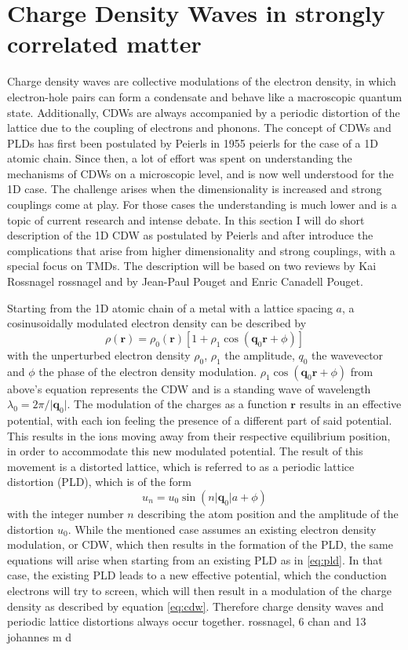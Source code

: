 \section{Charge Density Waves in strongly correlated matter}

Charge density waves are collective modulations of the electron density, in which electron-hole pairs can form a condensate and behave like a macroscopic quantum state.
Additionally, CDWs are always accompanied by a periodic distortion of the lattice due to the coupling of electrons and phonons.
The concept of CDWs and PLDs has first been postulated by Peierls in 1955 \cite{} peierls for the case of a 1D atomic chain.
Since then, a lot of effort was spent on understanding the mechanisms of CDWs on a microscopic level, and is now well understood for the 1D case.
The challenge arises when the dimensionality is increased and strong couplings come at play.
For those cases the understanding is much lower and is a topic of current research and intense debate.
In this section I will do short description of the 1D CDW as postulated by Peierls and after introduce the complications that arise from higher dimensionality and strong couplings, with a special focus on TMDs.
The description will be based on two reviews by Kai Rossnagel \cite{} rossnagel and by Jean-Paul Pouget and Enric Canadell \cite{} Pouget.

Starting from the 1D atomic chain of a metal with a lattice spacing $a$, a cosinusoidally modulated electron density can be described by
\begin{equation}
	\rho(\mathbf{r}) = \rho_0(\mathbf{r})[1+\rho_1 \cos(\mathbf{q}_0\mathbf{r}+\phi)]
	\label{eq:cdw}
\end{equation}
with the unperturbed electron density $\rho_0$, $\rho_1$ the amplitude, $q_0$ the wavevector and $\phi$ the phase of the electron density modulation.
$\rho_1 \cos(\mathbf{q}_0\mathbf{r}+\phi)$ from above's equation represents the CDW and is a standing wave of wavelength $\lambda_0 = 2\pi/\lvert \mathbf{q}_0\rvert$.
The modulation of the charges as a function $\mathbf{r}$ results in an effective potential, with each ion feeling the presence of a different part of said potential.
This results in the ions moving away from their respective equilibrium position, in order to accommodate this new modulated potential.
The result of this movement is a distorted lattice, which is referred to as a periodic lattice distortion (PLD), which is of the form
\begin{equation}
	u_n = u_0 \sin(n\lvert \mathbf{q}_0\rvert a+\phi)
	\label{eq:pld}
\end{equation}
with the integer number $n$ describing the atom position and the amplitude of the distortion $u_0$.
While the mentioned case assumes an existing electron density modulation, or CDW, which then results in the formation of the PLD, the same equations will arise when starting from an existing PLD as in \ref{eq:pld}.
In that case, the existing PLD leads to a new effective potential, which the conduction electrons will try to screen, which will then result in a modulation of the charge density as described by equation \ref{eq:cdw}.
Therefore charge density waves and periodic lattice distortions always occur together. rossnagel, 6 chan and 13 johannes m d

